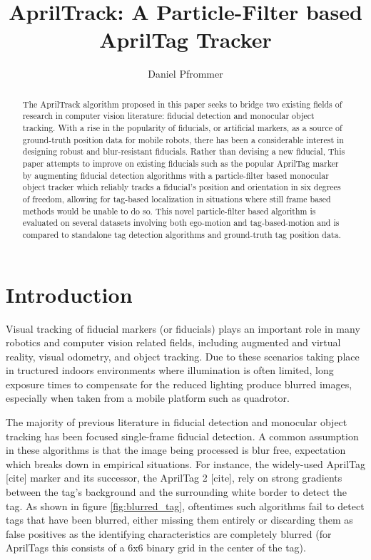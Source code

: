 \documentclass[letterpaper, 10 pt, conference]{ieeeconf}
\title{\textbf{AprilTrack: A Particle-Filter based AprilTag Tracker}}
\author{Daniel Pfrommer}
\date{}
\begin{document}
\maketitle

\begin{abstract}

	The AprilTrack algorithm proposed in this paper seeks to bridge two existing fields of research in computer vision literature: fiducial detection and monocular object tracking. With a rise in the popularity of fiducials, or artificial markers, as a source of ground-truth position data for mobile robots, there has been a considerable interest in designing robust and blur-resistant fiducials. Rather than devising a new fiducial, This paper attempts to improve on existing fiducials such as the popular AprilTag marker by augmenting fiducial detection algorithms with a particle-filter based monocular object tracker which reliably tracks a fiducial's position and orientation in six degrees of freedom, allowing for tag-based localization in situations where still frame based methods would be unable to do so. This novel particle-filter based algorithm is evaluated on several datasets involving both ego-motion and tag-based-motion and is compared to standalone tag detection algorithms and ground-truth tag position data.
	
\end{abstract}

\section{Introduction}


Visual tracking of fiducial markers (or fiducials) plays an important role in many robotics and computer vision related fields, including augmented and virtual reality, visual odometry, and object tracking. Due to these scenarios taking place in tructured indoors environments where illumination is often limited, long exposure times to compensate for the reduced lighting produce blurred images, especially when taken from a mobile platform such as quadrotor.


 The majority of previous literature in fiducial detection and monocular object tracking has been focused single-frame fiducial detection. A common assumption in these algorithms is that the image being processed is blur free, expectation which breaks down in empirical situations. For instance, the widely-used AprilTag [cite] marker and its successor, the AprilTag 2 [cite], rely on strong gradients between the tag's background and the surrounding white border to detect the tag. As shown in figure \ref{fig:blurred_tag}, oftentimes such algorithms fail to detect tags that have been blurred, either missing them entirely or discarding them as false positives as the identifying characteristics are completely blurred (for AprilTags this consists of a 6x6 binary grid in the center of the tag).
 
\end{document}
